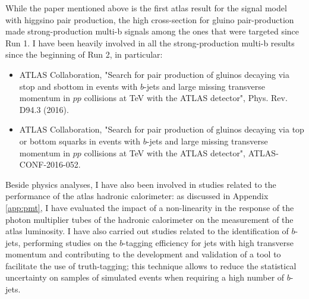 While the paper mentioned above is the first \gls{atlas} result for the signal model with higgsino pair production, 
the high cross-section for gluino pair-production made strong-production multi-b signals among the ones that were targeted since Run 1. 
I have been heavily involved in all the strong-production multi-b results since the beginning of Run 2, in particular:

\begin{itemize}
\item ATLAS Collaboration, "Search for pair production of gluinos decaying via stop and sbottom in events with $b$-jets and large missing transverse momentum in $pp$ collisions at \cmtre TeV with the ATLAS detector", Phys. Rev. D94.3 (2016).
\item ATLAS Collaboration, "Search for pair production of gluinos decaying via top or bottom squarks in events with $b$-jets and large missing transverse momentum in
$pp$ collisions at \cmtre TeV with the ATLAS detector", ATLAS-CONF-2016-052.
\end{itemize}

Beside physics analyses, I have also been involved in studies related to the performance of the \gls{atlas} hadronic calorimeter: 
as discussed in Appendix \ref{app:pmt}, I have evaluated the impact of a non-linearity in the response of the photon multiplier tubes of the 
hadronic calorimeter on the measurement of the \gls{atlas} luminosity. 
I have also carried out studies related to the identification of $b$-jets, 
performing studies on the $b$-tagging efficiency for jets with high transverse momentum and contributing to 
the development and validation of a tool to facilitate the use of truth-tagging; this technique 
allows to reduce the statistical uncertainty on samples of simulated events when requiring a high number of $b$-jets. 


